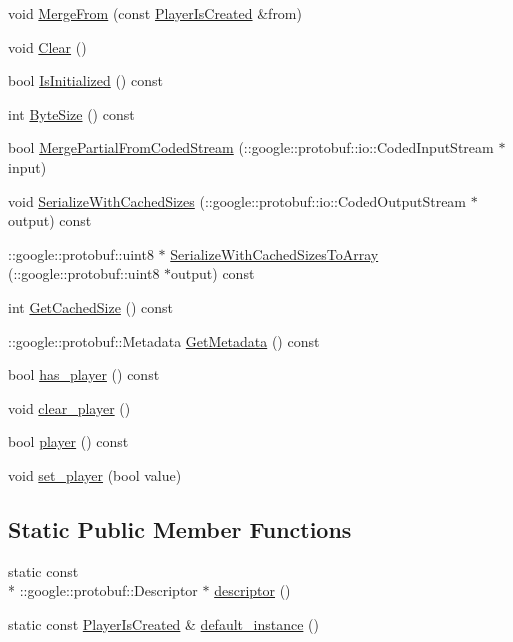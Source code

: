\begin{DoxyCompactItemize}
\item 
void \hyperlink{class_player_is_created_a341ddc4fd72b3d6046ba324a4a4ae87a}{Merge\-From} (const \hyperlink{class_player_is_created}{Player\-Is\-Created} \&from)
\item 
void \hyperlink{class_player_is_created_a42ba62c53797a0400873a181f706f014}{Clear} ()
\item 
bool \hyperlink{class_player_is_created_a3f8c85e6394c9681d6bc8550674b12a9}{Is\-Initialized} () const 
\item 
int \hyperlink{class_player_is_created_ac39384c2cda7d7478e5e237827995f1f}{Byte\-Size} () const 
\item 
bool \hyperlink{class_player_is_created_af968fcaea9bafaef6d27d1520ecb17df}{Merge\-Partial\-From\-Coded\-Stream} (\-::google\-::protobuf\-::io\-::\-Coded\-Input\-Stream $\ast$input)
\item 
void \hyperlink{class_player_is_created_aeedb3484a217702a0876097852c8fea8}{Serialize\-With\-Cached\-Sizes} (\-::google\-::protobuf\-::io\-::\-Coded\-Output\-Stream $\ast$output) const 
\item 
\-::google\-::protobuf\-::uint8 $\ast$ \hyperlink{class_player_is_created_a13b3f9d7a0b84e04ce730fcf54ba6603}{Serialize\-With\-Cached\-Sizes\-To\-Array} (\-::google\-::protobuf\-::uint8 $\ast$output) const 
\item 
int \hyperlink{class_player_is_created_a6d8061fd2cb9f20a7da3496871a54bf1}{Get\-Cached\-Size} () const 
\item 
\-::google\-::protobuf\-::\-Metadata \hyperlink{class_player_is_created_adbfbc228667ab0a18842e0957557a35e}{Get\-Metadata} () const 
\item 
bool \hyperlink{class_player_is_created_ae6153984b0901ab6cd1ddce575fc4d46}{has\-\_\-player} () const 
\item 
void \hyperlink{class_player_is_created_a519e740c8a32d1d12a055656b343cbe2}{clear\-\_\-player} ()
\item 
bool \hyperlink{class_player_is_created_af2c5f8ac5a26a1ee7a0188db7e40353c}{player} () const 
\item 
void \hyperlink{class_player_is_created_a733f2e902a0ceba19444f5674cc43298}{set\-\_\-player} (bool value)
\end{DoxyCompactItemize}
\subsection*{Static Public Member Functions}
\begin{DoxyCompactItemize}
\item 
static const \\*
\-::google\-::protobuf\-::\-Descriptor $\ast$ \hyperlink{class_player_is_created_a1593f54d4c123114c10177b7cac778d0}{descriptor} ()
\item 
static const \hyperlink{class_player_is_created}{Player\-Is\-Created} \& \hyperlink{class_player_is_created_ad4a6beb4d9c38cad9a89e77dd81e1f75}{default\-\_\-instance} ()
\end{DoxyCompactItemize}
